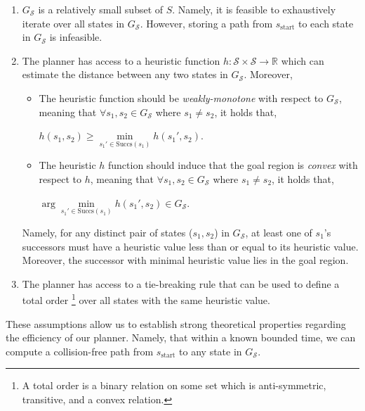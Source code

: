 \documentclass[letterpaper]{article} %
\newcommand{\calS}{\ensuremath{\mathcal{S}}\xspace}
\newcommand{\sStart}{\ensuremath{s_{\text{start}}\xspace}}
\begin{document}
\begin{enumerate}[label={\textbf{A\arabic*}}]
  \item \label{assum:1} $G_\calS$ is a relatively small subset of $S$. Namely, it is feasible to exhaustively iterate over all states in $G_\calS$.
However, storing a path from $\sStart$ to each state in $G_\calS$ is infeasible.
  
  \item \label{assum:2} The planner has access to a heuristic function $h: \calS \times \calS \rightarrow \mathbb{R}$ which can estimate the distance between any two states in $G_\calS$. Moreover, 
 \begin{itemize}
 	\item The heuristic function should be \textit{weakly-monotone} with respect to $G_\calS$, meaning that $\forall s_1, s_2  \in G_\calS$ where $s_1 \neq s_2 $, it holds that,
  \begin{center}
    $h(s_1, s_2) \geq \min\limits_{s_1' \in \text{Succs}(s_1)} h(s_1', s_2)$.
  \end{center}

	\item The heuristic $h$ function should induce that the goal region is \emph{convex} with respect to $h$, meaning that $\forall s_1, s_2  \in G_\calS$ where $s_1 \neq s_2 $, it holds that,
  \begin{center}
     $\arg \min \limits_{s_1' \in \text{Succs}(s_1)} h(s_1', s_2) \in G_\calS$.
  \end{center}

 \end{itemize}
 Namely, for any distinct pair of states ($s_1, s_2$) in $G_\calS$, at least one of $s_1$'s successors  must have a heuristic value less than or equal to its heuristic value.
 Moreover, the successor with minimal heuristic value lies in the goal region.


  \item \label{assum:3} The planner has access to a tie-breaking rule that can be used to define a total order \footnote{A total order is a binary relation on some set which is anti-symmetric, transitive, and a convex relation.} over all states with the same heuristic value.
  \end{enumerate}

These assumptions allow us to establish strong theoretical properties regarding the efficiency of our planner. Namely, that
within a known bounded time, we can compute a collision-free path from $\sStart$ to any state in $G_\calS$. 
\end{document}
